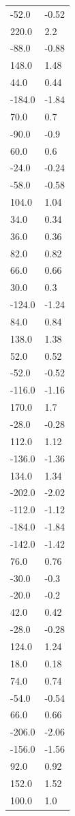 \begin{longtable}{ll}
-52.0 & -0.52 \\
220.0 & 2.2 \\
-88.0 & -0.88 \\
148.0 & 1.48 \\
44.0 & 0.44 \\
-184.0 & -1.84 \\
70.0 & 0.7 \\
-90.0 & -0.9 \\
60.0 & 0.6 \\
-24.0 & -0.24 \\
-58.0 & -0.58 \\
104.0 & 1.04 \\
34.0 & 0.34 \\
36.0 & 0.36 \\
82.0 & 0.82 \\
66.0 & 0.66 \\
30.0 & 0.3 \\
-124.0 & -1.24 \\
84.0 & 0.84 \\
138.0 & 1.38 \\
52.0 & 0.52 \\
-52.0 & -0.52 \\
-116.0 & -1.16 \\
170.0 & 1.7 \\
-28.0 & -0.28 \\
112.0 & 1.12 \\
-136.0 & -1.36 \\
134.0 & 1.34 \\
-202.0 & -2.02 \\
-112.0 & -1.12 \\
-184.0 & -1.84 \\
-142.0 & -1.42 \\
76.0 & 0.76 \\
-30.0 & -0.3 \\
-20.0 & -0.2 \\
42.0 & 0.42 \\
-28.0 & -0.28 \\
124.0 & 1.24 \\
18.0 & 0.18 \\
74.0 & 0.74 \\
-54.0 & -0.54 \\
66.0 & 0.66 \\
-206.0 & -2.06 \\
-156.0 & -1.56 \\
92.0 & 0.92 \\
152.0 & 1.52 \\
100.0 & 1.0 \\

\end{longtable}

